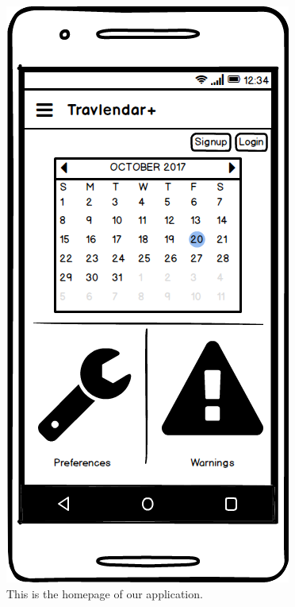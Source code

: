 \documentclass[11pt]{article}
\begin{document}
	\begin{figure}
		\centering
		\includegraphics[width=0.7\linewidth]{Homepage.png}
		\caption{This is the homepage of our application.}
		\label{fig:homepage}
	\end{figure}
	
\end{document}

